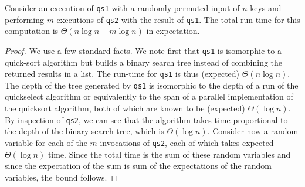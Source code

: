 \begin{abstrsyn}
\begin{theorem}
  Consider an execution of \texttt{qs1} with a randomly permuted input
  of $n$ keys and performing $m$ executions of \texttt{qs2} with the
  result of \texttt{qs1}.  The total run-time for this computation is
  $\Theta(n\log{n} + m\log{n})$ in expectation.
\end{theorem}
\begin{proof}
  We use a few standard facts.  We note first that \texttt{qs1} is
  isomorphic to a quick-sort algorithm but builds a binary search tree
  instead of combining the returned results in a list.  The run-time
  for \texttt{qs1} is thus (expected) $\Theta(n\log{n})$.
%
  The depth of the tree generated by \texttt{qs1} is isomorphic to the
    depth of a run of the quickselect algorithm or equivalently to the
    span of a parallel implementation of the quicksort algorithm, both
    of which are known to be (expected) $\Theta(\log{n})$.
%
    By inspection of \texttt{qs2}, we can see that the algorithm takes
    time proportional to the depth of the binary search tree, which is
    $\Theta(\log{n})$. Consider now a random variable for each of the
    $m$ invocations of \texttt{qs2}, each of which takes expected
    $\Theta(\log{n})$ time.  Since the total time is the sum of these
    random variables and since the expectation of the sum is sum of
    the expectations of the random variables, the bound follows.
\end{proof}

\end{abstrsyn}
